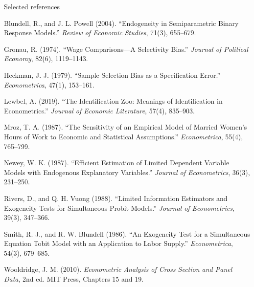 \documentclass[aspectratio=169,11pt]{beamer}
\begin{document}
\begin{frame}{Selected references}

\scriptsize

Blundell, R., and J. L. Powell (2004).
``Endogeneity in Semiparametric Binary Response Models.''
\textit{Review of Economic Studies}, 71(3), 655--679.

\vspace{0.2em}

Gronau, R. (1974).
``Wage Comparisons---A Selectivity Bias.''
\textit{Journal of Political Economy}, 82(6), 1119--1143.

\vspace{0.2em}

Heckman, J. J. (1979).
``Sample Selection Bias as a Specification Error.''
\textit{Econometrica}, 47(1), 153--161.

\vspace{0.2em}

Lewbel, A. (2019).
``The Identification Zoo: Meanings of Identification in Econometrics.''
\textit{Journal of Economic Literature}, 57(4), 835--903.

\vspace{0.2em}

Mroz, T. A. (1987).
``The Sensitivity of an Empirical Model of Married Women's Hours of Work
to Economic and Statistical Assumptions.''
\textit{Econometrica}, 55(4), 765--799.

\vspace{0.2em}

Newey, W. K. (1987).
``Efficient Estimation of Limited Dependent Variable Models with
Endogenous Explanatory Variables.''
\textit{Journal of Econometrics}, 36(3), 231--250.

\vspace{0.2em}

Rivers, D., and Q. H. Vuong (1988).
``Limited Information Estimators and Exogeneity Tests for Simultaneous
Probit Models.''
\textit{Journal of Econometrics}, 39(3), 347--366.

\vspace{0.2em}

Smith, R. J., and R. W. Blundell (1986).
``An Exogeneity Test for a Simultaneous Equation Tobit Model with an
Application to Labor Supply.''
\textit{Econometrica}, 54(3), 679--685.

\vspace{0.2em}

Wooldridge, J. M. (2010).
\textit{Econometric Analysis of Cross Section and Panel Data}, 2nd ed.
MIT Press, Chapters 15 and 19.

\end{frame}
\end{document}
